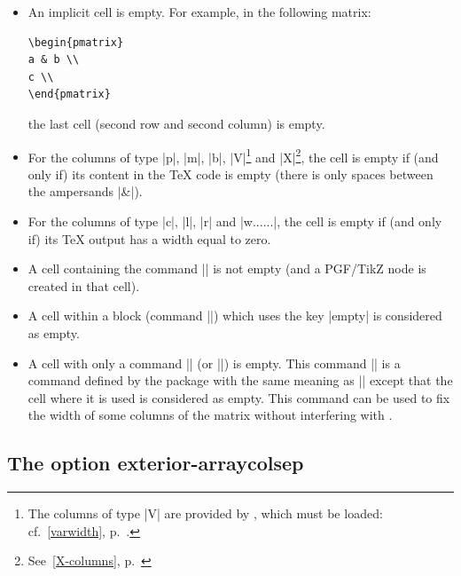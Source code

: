 \documentclass[dvipsnames]{article}
\begin{document}
\begin{itemize}
\item An implicit cell is empty. For example, in the following matrix:

\begin{Verbatim}
\begin{pmatrix}
a & b \\
c \\
\end{pmatrix}
\end{Verbatim}

the last cell (second row and second column) is empty.

\medskip
\item For the columns of type |p|, |m|, |b|, |V|\footnote{The columns of type
  |V| are provided by , which must be loaded:
  cf.~\ref{varwidth}, p.~\pageref{varwidth}.} and
|X|\footnote{See~\ref{X-columns}, p.~\pageref{X-columns}}, the
cell is empty if (and only if) its content in the TeX code is empty (there is
only spaces between the ampersands |&|).

\medskip
\item For the columns of type |c|, |l|, |r| and |w{...}{...}|, the cell is
empty if (and only if) its TeX output has a width equal to zero.

\medskip
\item {}
A cell containing the command |\NotEmpty| is not empty (and a
PGF/TikZ node is created in that cell).

\medskip
\item A cell within a block (command |\Block|) which uses the key |empty|
is considered as empty.

\medskip
\item A cell with only a command |\Hspace| (or |\Hspace*|) is empty. This
command |\Hspace| is a command defined by the package  with
the same meaning as |\hspace| except that the cell where it is used is
considered as empty. This command can be used to fix the width of some columns
of the matrix without interfering with .
\end{itemize}


\subsection{The option exterior-arraycolsep}

\end{document}

